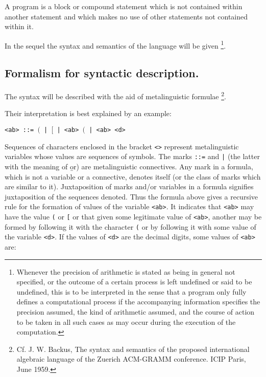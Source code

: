 \documentclass[a4paper,11pt]{article}
\begin{document}
A program is a block or compound statement which is not contained within
another statement and which makes no use of other statements not
contained within it.

In the sequel the syntax and semantics of the language will be given
\footnote{Whenever the precision of arithmetic is stated as being in
general not specified, or the outcome of a certain process is left
undefined or said to be undefined, this is to be interpreted in the
sense that a program only fully defines a computational process if the
accompanying information specifies the precision assumed, the kind of
arithmetic assumed, and the course of action to be taken in all such
cases as may occur during the execution of the computation.}.



\subsection{Formalism for syntactic description.}
\label{FormalismForSyntacticDescription}


The syntax will be described with the aid of metalinguistic formulae
\footnote{Cf. J. W. Backus, The syntax and semantics of the proposed
    international algebraic language of the Zuerich ACM-GRAMM
    conference. ICIP Paris, June 1959.}.

Their interpretation is best explained by an example:

\begin{flushleft}
\vspace{0.2em}\texttt{<ab> ::= $($ | $[$ | <ab> $($ | <ab> <d>}\\
\end{flushleft}

Sequences of characters enclosed in the bracket \texttt{<>} represent
metalinguistic variables whose values are sequences of symbols. The
marks \texttt{::=} and \texttt{|} (the latter with the meaning of
\b{or}) are metalinguistic connectives. Any mark in a formula, which
is not a variable or a connective, denotes itself (or the class of
marks which are similar to it). Juxtaposition of marks and/or
variables in a formula signifies juxtaposition of the sequences
denoted. Thus the formula above gives a recursive rule for the
formation of values of the variable \texttt{<ab>}. It indicates that
\texttt{<ab>} may have the value \texttt{(} or \texttt{[} or that
given some legitimate value of \texttt{<ab>}, another may be formed by
following it with the character \texttt{(} or by following it with
some value of the variable \texttt{<d>}. If the values of \texttt{<d>}
are the decimal digits, some values of \texttt{<ab>} are:
\end{document}
